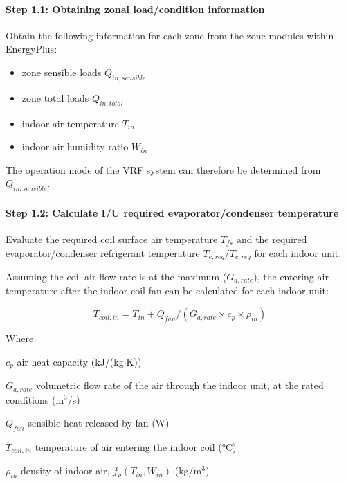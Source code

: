 \paragraph{Step 1.1: Obtaining zonal load/condition information}\label{step-1.1-obtaining-zonal-load-condition-information}

Obtain the following information for each zone from the zone modules within EnergyPlus: 

\begin{itemize}
  \item
    zone sensible loads $Q_{in, sensible}$
  \item
    zone total loads $Q_{in, total}$
  \item
    indoor air temperature $T_{in}$
  \item
    indoor air humidity ratio $W_{in}$
\end{itemize}

The operation mode of the VRF system can therefore be determined from $Q_{in, sensible}$.

\paragraph{Step 1.2: Calculate I/U required evaporator/condenser temperature}\label{step-1.2-calculate-i-u-required-evaporator-condenser-temperature}

Evaluate the required coil surface air temperature $T_{fs}$ and the required evaporator/condenser refrigerant temperature $T_{e,req}/{T_{c,req}}$ for each indoor unit. 

Assuming the coil air flow rate is at the maximum ($G_{a,rate}$), the entering air temperature after the indoor coil fan can be calculated for each indoor unit:

\begin{equation}
  T_{coil,in}=T_{in}+Q_{fan}/(G_{a,rate}\times{c_p}\times\rho_{in})
\end{equation}

Where

$c_p$	air heat capacity (kJ/(kg$\cdot$K))

$G_{a,rate}$	volumetric flow rate of the air through the indoor unit, at the rated conditions (m\(^3\)/s)

$Q_{fan}$	sensible heat released by fan (W)

$T_{coil,in}$	temperature of air entering the indoor coil (°C)

$\rho_{in}$	density of indoor air, $f_{\rho}(T_{in},W_{in})$  (kg/m\(^3\))

